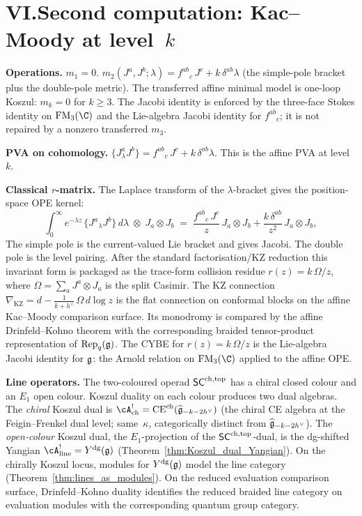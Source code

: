 \section*{VI.\quad Second computation: Kac--Moody at level~$k$}

\noindent\textbf{Operations.}\enspace
$m_1 = 0$.
$m_2(J^a, J^b;\lambda) = f^{ab}{}_c\,J^c + k\,\delta^{ab}\lambda$
(the simple-pole bracket plus the double-pole metric).
The transferred affine minimal model is one-loop Koszul:
$m_k=0$ for $k\ge3$.  The Jacobi identity is enforced by the
three-face Stokes identity on $\FM_3(\C)$ and the Lie-algebra Jacobi
identity for $f^{ab}{}_c$; it is not repaired by a nonzero transferred
$m_3$.

\smallskip
\noindent\textbf{PVA on cohomology.}\enspace
$\{J^a_\lambda J^b\} = f^{ab}{}_c\,J^c + k\,\delta^{ab}\lambda$.
This is the affine PVA at level~$k$.

\smallskip
\noindent\textbf{Classical $r$-matrix.}\enspace
The Laplace transform of the $\lambda$-bracket gives the
position-space OPE kernel:
\[
\int_0^\infty e^{-\lambda z}\,
 \{J^a{}_\lambda J^b\}\, d\lambda
\;\otimes\; J_a \otimes J_b
\;=\;
\frac{f^{ab}{}_c\,J^c}{z}\,J_a\otimes J_b
 + \frac{k\,\delta^{ab}}{z^2}\,J_a\otimes J_b ,
\]
The simple pole is the current-valued Lie bracket and gives Jacobi.
The double pole is the level pairing.  After the standard
factorisation/KZ reduction this invariant form is packaged as the
trace-form collision residue $r(z)=k\,\Omega/z$, where
$\Omega=\sum_a J^a\otimes J_a$ is the split Casimir.
The KZ connection $\nabla_{\mathrm{KZ}} = d - \frac{1}{k+h^\vee}\,\Omega\,d\log z$ is
the flat connection on conformal blocks on the affine Kac--Moody
comparison surface. Its monodromy is compared by the affine
Drinfeld--Kohno theorem with the corresponding braided
tensor-product representation of $\mathrm{Rep}_q(\mathfrak{g})$.
The CYBE for $r(z) =
k\,\Omega/z$ is the Lie-algebra Jacobi identity for $\mathfrak{g}$: the
Arnold relation on $\FM_3(\C)$ applied to the affine OPE.

\smallskip
\noindent\textbf{Line operators.}\enspace
The two-coloured operad $\mathsf{SC}^{\mathrm{ch,top}}$ has a chiral closed colour
and an $E_1$ open colour. Koszul duality on each colour
produces two dual algebras. The \emph{chiral} Koszul dual is
$\cA^!_{\mathrm{ch}} = \mathrm{CE}^{\mathrm{ch}}(\widehat{\fg}_{-k-2h^\vee})$
(the chiral CE algebra at the Feigin--Frenkel dual level;
same~$\kappa$, categorically distinct from $\widehat{\mathfrak{g}}_{-k-2h^\vee}$).
The \emph{open-colour} Koszul dual, the
$E_1$-projection of the $\mathsf{SC}^{\mathrm{ch,top}}$-dual, is the dg-shifted
Yangian $\cA^!_{\mathrm{line}} = \Ydg(\fg)$
\textup{(}Theorem~\textup{\ref{thm:Koszul_dual_Yangian}}\textup{)}.
On the chirally Koszul locus, modules for $Y^{\mathrm{dg}}(\mathfrak{g})$ model
the line category
\textup{(}Theorem~\textup{\ref{thm:lines_as_modules}}\textup{)}. On
the reduced evaluation comparison surface, Drinfeld--Kohno duality
identifies the reduced braided line category on evaluation modules
with the corresponding quantum group category.

